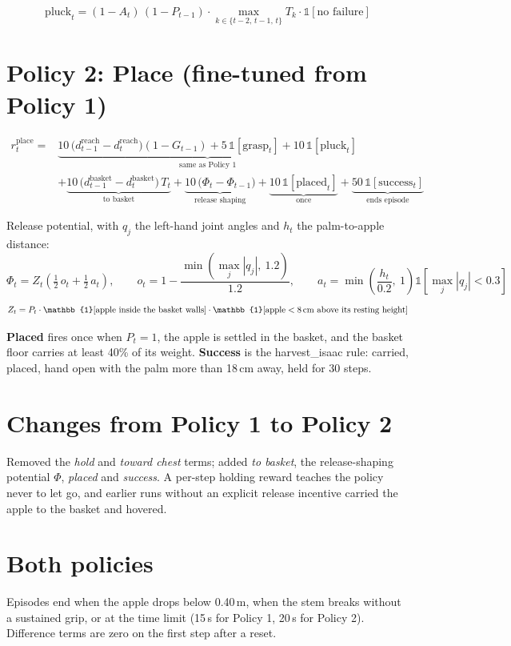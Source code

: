 \documentclass[11pt]{article}
\newcommand{\ind}{\mathbb{1}}
\begin{document}
\begin{equation}
\mathrm{pluck}_t = (1-A_t)\,(1-P_{t-1})\cdot \max_{k\in\{t-2,\,t-1,\,t\}} T_k \cdot \ind[\text{no failure}]
\end{equation}

\section*{Policy 2: Place (fine-tuned from Policy 1)}

\begin{equation}
\begin{aligned}
r_t^{\mathrm{place}} ={}&
\underbrace{10\,\big(d^{\mathrm{reach}}_{t-1}-d^{\mathrm{reach}}_{t}\big)(1-G_{t-1})
+ 5\,\ind[\mathrm{grasp}_t] + 10\,\ind[\mathrm{pluck}_t]}_{\text{same as Policy 1}} \\
&+\underbrace{10\,\big(d^{\mathrm{basket}}_{t-1}-d^{\mathrm{basket}}_{t}\big)\,T_t}_{\text{to basket}}
+\underbrace{10\,\big(\Phi_t-\Phi_{t-1}\big)}_{\text{release shaping}}
+\underbrace{10\,\ind[\mathrm{placed}_t]}_{\text{once}}
+\underbrace{50\,\ind[\mathrm{success}_t]}_{\text{ends episode}}
\end{aligned}
\end{equation}

Release potential, with $q_j$ the left-hand joint angles and $h_t$ the palm-to-apple distance:
\begin{equation}
\Phi_t = Z_t\left(\tfrac12\, o_t + \tfrac12\, a_t\right),\qquad
o_t = 1-\frac{\min\!\left(\max_j |q_j|,\ 1.2\right)}{1.2},\qquad
a_t = \min\!\left(\frac{h_t}{0.2},\ 1\right)\ind\!\left[\max_j |q_j| < 0.3\right]
\end{equation}
\begin{equation}
Z_t = P_t \cdot \ind[\text{apple inside the basket walls}] \cdot \ind[\text{apple} < 8\text{\,cm above its resting height}]
\end{equation}

\noindent\textbf{Placed} fires once when $P_t=1$, the apple is settled in the basket, and the basket floor
carries at least 40\% of its weight. \textbf{Success} is the harvest\_isaac rule: carried, placed,
hand open with the palm more than 18\,cm away, held for 30 steps.

\section*{Changes from Policy 1 to Policy 2}

Removed the \emph{hold} and \emph{toward chest} terms; added \emph{to basket}, the release-shaping
potential $\Phi$, \emph{placed} and \emph{success}. A per-step holding reward teaches the policy never to
let go, and earlier runs without an explicit release incentive carried the apple to the basket and hovered.

\section*{Both policies}

Episodes end when the apple drops below 0.40\,m, when the stem breaks without a sustained grip, or at the
time limit (15\,s for Policy 1, 20\,s for Policy 2). Difference terms are zero on the first step after a reset.
\end{document}
